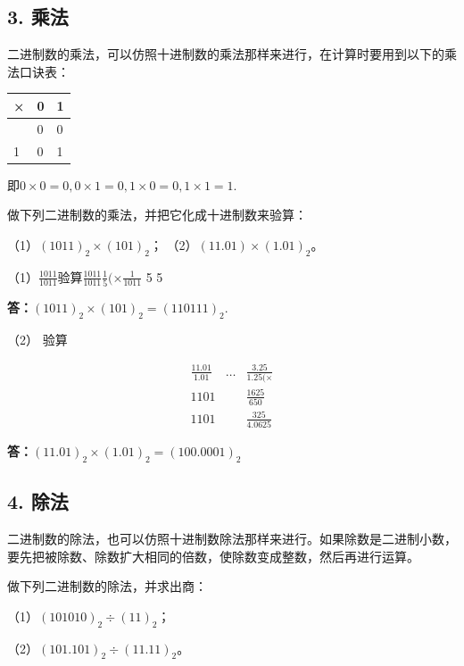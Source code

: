 \subsection{3. 乘法}

二进制数的乘法，可以仿照十进制数的乘法那样来进行，在计算时要用到以下的乘法口诀表：

{\def\LTcaptype{none} %
\begin{longtable}[]{@{}lll@{}}
\toprule\noalign{}
× & 0 & 1 \\
\midrule\noalign{}
\endhead
\bottomrule\noalign{}
\endlastfoot
0 & 0 & 0 \\
1 & 0 & 1 \\
\end{longtable}
}

即\(0 \times 0 = 0, 0 \times 1 = 0, 1 \times 0 = 0, 1 \times 1 = 1.\)

 做下列二进制数的乘法，并把它化成十进制数来验算：

（1）\((1011)_2 \times (101)_2\)； （2）\((11.01) \times (1.01)_2\)。

（1）\(\frac{1011}{1011}\)验算\(\frac{1011}{1011}\)\(\frac{1}{5} (\times\)\(\frac{1}{1011}\)
5 5

\textbf{答：}\((1011)_2\times (101)_2 = (110111)_2.\)

（2） 验算

\[
\begin{array}{ccc} \frac{11.01}{1.01} & \dots & \frac{3.25}{1.25 (\times} \\ \hline 1101 & & \frac{1625}{650} \\ 1101 & & \frac{325}{4.0625} \end{array}
\]

\textbf{答：}\((11.01)_{2}\times(1.01)_{2}=(100.0001)_{2}\)

\subsection{4. 除法}

二进制数的除法，也可以仿照十进制数除法那样来进行。如果除数是二进制小数，要先把被除数、除数扩大相同的倍数，使除数变成整数，然后再进行运算。

 做下列二进制数的除法，并求出商：

（1）\((101010)_2 \div (11)_2\)；

（2）\((101.101)_2 \div (11.11)_2\)。


